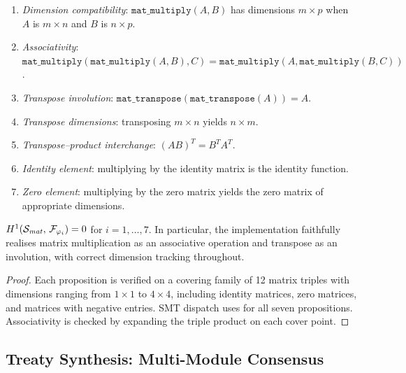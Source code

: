 \begin{enumerate}[nosep,label=(\roman*)]
  \item \emph{Dimension compatibility}: $\texttt{mat\_multiply}(A,B)$
    has dimensions $m \times p$ when $A$ is $m\times n$ and $B$ is
    $n \times p$.
  \item \emph{Associativity}:
    $\texttt{mat\_multiply}(\texttt{mat\_multiply}(A,B),C) =
     \texttt{mat\_multiply}(A,\texttt{mat\_multiply}(B,C))$.
  \item \emph{Transpose involution}:
    $\texttt{mat\_transpose}(\texttt{mat\_transpose}(A)) = A$.
  \item \emph{Transpose dimensions}: transposing $m \times n$ yields
    $n \times m$.
  \item \emph{Transpose--product interchange}:
    $(AB)^T = B^T A^T$.
  \item \emph{Identity element}: multiplying by the identity matrix
    is the identity function.
  \item \emph{Zero element}: multiplying by the zero matrix yields
    the zero matrix of appropriate dimensions.
\end{enumerate}

\begin{theorem}\label{thm:matrix}
$H^{1}(\mathcal{S}_{\mathit{mat}},\, \mathcal{F}_{\varphi_i}) = 0$
for $i = 1,\ldots,7$.  In particular, the implementation faithfully
realises matrix multiplication as an associative operation and
transpose as an involution, with correct dimension tracking
throughout.
\end{theorem}

\begin{proof}
Each proposition is verified on a covering family of 12 matrix
triples with dimensions ranging from $1\times 1$ to $4 \times 4$,
including identity matrices, zero matrices, and matrices with
negative entries.  SMT dispatch uses \QFLIA{} for all seven
propositions.  Associativity is checked by expanding the triple
product on each cover point.
\end{proof}


\subsection{Treaty Synthesis: Multi-Module Consensus}%
\label{sec:app-treaty}

